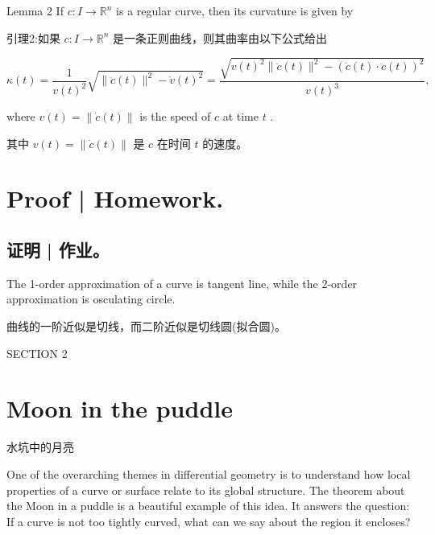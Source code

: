Lemma 2 If \(c : I \rightarrow  {\mathbb{R}}^{n}\) is a regular curve, then its curvature is given by

\begin{tcolorbox}
引理2:如果 \(c : I \rightarrow  {\mathbb{R}}^{n}\) 是一条正则曲线，则其曲率由以下公式给出
\end{tcolorbox}

\[
\kappa \left( t\right)  = \frac{1}{v{\left( t\right) }^{2}}\sqrt{\parallel \ddot{c}\left( t\right) {\parallel }^{2} - \dot{v}{\left( t\right) }^{2}} = \frac{\sqrt{v{\left( t\right) }^{2}\parallel \ddot{c}\left( t\right) {\parallel }^{2} - {\left( \dot{c}\left( t\right)  \cdot  \ddot{c}\left( t\right) \right) }^{2}}}{v{\left( t\right) }^{3}}, \tag{1.4}
\]

where \(v\left( t\right)  = \parallel \dot{c}\left( t\right) \parallel\) is the speed of \(c\) at time \(t\) .

\begin{tcolorbox}
其中 \(v\left( t\right)  = \parallel \dot{c}\left( t\right) \parallel\) 是 \(c\) 在时间 \(t\) 的速度。
\end{tcolorbox}

\section*{Proof | Homework.}

\begin{tcolorbox}
\section*{证明 | 作业。}
\end{tcolorbox}

The 1-order approximation of a curve is tangent line, while the 2-order approximation is osculating circle.

\begin{tcolorbox}
曲线的一阶近似是切线，而二阶近似是切线圆(拟合圆)。
\end{tcolorbox}

SECTION 2

\section*{Moon in the puddle}

\begin{tcolorbox}
水坑中的月亮
\end{tcolorbox}

One of the overarching themes in differential geometry is to understand how local properties of a curve or surface relate to its global structure. The theorem about the Moon in a puddle is a beautiful example of this idea. It answers the question: If a curve is not too tightly curved, what can we say about the region it encloses?

